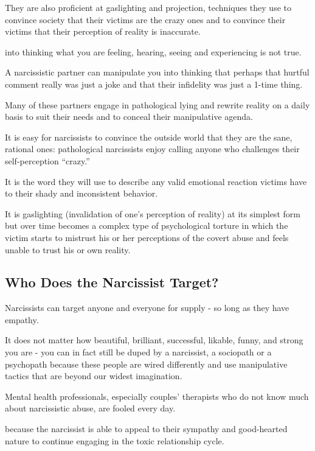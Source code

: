 \documentclass[oneside]{book}
\numberwithin{equation}{section}
\begin{document}
They are also proficient at gaslighting and projection, techniques they use to convince society that their victims are the crazy ones and to convince their victims that their perception of reality is inaccurate.

%
 into thinking what you are feeling, hearing, seeing and experiencing is not true.

A narcissistic partner can manipulate you into thinking that perhaps that hurtful comment really was just a joke and that their infidelity was just a 1-time thing.

Many of these partners engage in pathological lying and rewrite reality on a daily basis to suit their needs and to conceal their manipulative agenda.

%

It is easy for narcissists to convince the outside world that they are the sane, rational ones: pathological narcissists enjoy calling anyone who challenges their self-perception ``crazy.''

It is the word they will use to describe any valid emotional reaction victims have to their shady and inconsistent behavior.

It is gaslighting (invalidation of one's perception of reality) at its simplest form but over time becomes a complex type of psychological torture in which the victim starts to mistrust his or her perceptions of the covert abuse and feels unable to trust his or own reality.

\subsection{Who Does the Narcissist Target?}
Narcissists can target anyone and everyone for supply - so long as they have empathy.

It does not matter how beautiful, brilliant, successful, likable, funny, and strong you are - you can in fact still be duped by a narcissist, a sociopath or a psychopath because these people are wired differently and use manipulative tactics that are beyond our widest imagination.

Mental health professionals, especially couples' therapists who do not know much about narcissistic abuse, are fooled every day.

 because the narcissist is able to appeal to their sympathy and good-hearted nature to continue engaging in the toxic relationship cycle.
\end{document}
